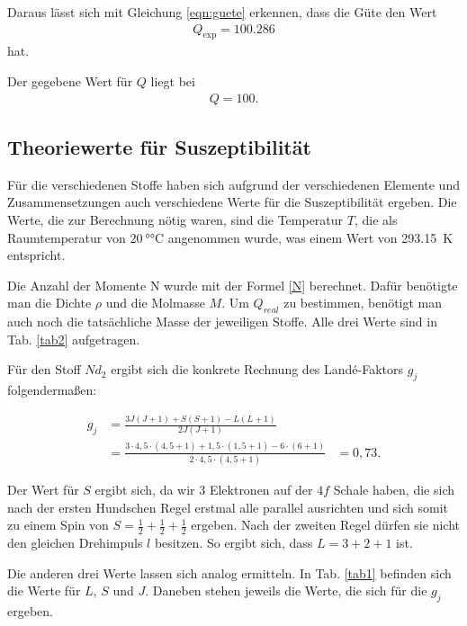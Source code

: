 \noindent Daraus lässt sich mit Gleichung \eqref{eqn:guete} erkennen, dass die Güte den Wert 
\begin{align*} 
    Q_\text{exp} = \num{100.286}
\end{align*}
hat. 

\noindent Der gegebene Wert für $Q$ liegt bei 
\begin{align*} 
    Q = \num{100}.
\end{align*}


\subsection{Theoriewerte für Suszeptibilität} 
Für die verschiedenen Stoffe haben sich aufgrund der verschiedenen Elemente und Zusammensetzungen auch verschiedene 
Werte für die Suszeptibilität ergeben. 
Die Werte, die zur Berechnung nötig waren, sind die Temperatur $T$, die als Raumtemperatur von $\SI{20}{\degree\celsius}$ angenommen wurde, was einem Wert von \SI{293.15}{\kelvin} entspricht. 

Die Anzahl der Momente N wurde mit der Formel \eqref{N} berechnet. Dafür benötigte man die Dichte $\rho$ und die Molmasse $M$. Um $Q_{real}$ zu bestimmen, benötigt man auch noch die tatsächliche Masse der jeweiligen Stoffe. Alle drei Werte sind in Tab. \ref{tab2} aufgetragen. 



Für den Stoff $Nd_2$ ergibt sich die konkrete Rechnung des Landé-Faktors $g_j$ folgendermaßen: 

\begin{align*}
    g_j &= \frac{3 J (J+1) + S (S+1) - L (L+1)}{2 J (J+1)} \\
        &= \frac{3 \cdot 4,5 \cdot(4,5 + 1) + 1,5 \cdot (1,5 +1) - 6 \cdot (6+1)}{2 \cdot 4,5 \cdot (4,5 + 1)}
        &= 0,73.
\end{align*} 

Der Wert für $S$ ergibt sich, da wir \num{3} Elektronen auf der $4f$ Schale haben, die sich nach der ersten Hundschen Regel erstmal alle parallel ausrichten und sich somit zu einem Spin von $S = \frac{1}{2}+ \frac{1}{2} + \frac{1}{2}$ ergeben. Nach der zweiten Regel dürfen sie nicht den gleichen Drehimpuls $l$ besitzen. So ergibt sich, dass $L = 3 + 2 + 1$ ist. 

\noindent Die anderen drei Werte lassen sich analog ermitteln. 
In Tab. \ref{tab1} befinden sich die Werte für $L$, $S$ und $J$. Daneben stehen jeweils die Werte, die sich für 
die $g_j$ ergeben. 

